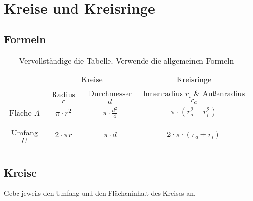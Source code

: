 


    \section*{Kreise und Kreisringe}

    \subsection*{Formeln}
    \begin{table}
        \caption{Vervollständige die Tabelle. Verwende die allgemeinen Formeln}
        \label{tab:allgFormeln}
        \begin{tabular}{c | c c | c}
            \toprule
            & \multicolumn{2}{c}{Kreise}
            & {Kreisringe} \\
            & {Radius $r$}
            & {Durchmesser $d$}
            & {Innenradius $r_i$ \& Außenradius $r_a$}\\
            \midrule
            Fläche $A$ & $π \cdot r^2$ & $π \cdot \frac{d^2}{4}$ & $π \cdot (r_a^2 - r_i^2)$     \\
            & & & \\
            & & & \\
            Umfang $U$ & $2 \cdot π r$ & $π \cdot d$             & $2 \cdot π \cdot (r_a + r_i)$ \\
            & & & \\
            & & & \\
            \bottomrule
        \end{tabular}
    \end{table}

    \subsection*{Kreise}
    Gebe jeweils den Umfang und den Flächeninhalt des Kreises an.

